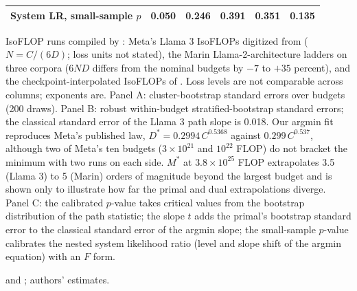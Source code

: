 \begin{table}[tp]
\begin{tabular}{@{}lccccc@{}}
System LR, small-sample $p$ & 0.050 & 0.246 & 0.391 & 0.351 & 0.135 \\
\bottomrule
\end{tabular}
\par\smallskip
\begin{tablenotes}IsoFLOP runs compiled by \citet{czech2026problems}: Meta's Llama 3 IsoFLOPs digitized from
\citet{grattafiori2024llama} ($N=C/(6D)$; loss units not stated), the Marin Llama-2-architecture ladders on three
corpora \citep{marin2026ladders} ($6ND$ differs from the nominal budgets by $-7$ to $+35$ percent), and the
checkpoint-interpolated IsoFLOPs of \citet{li2025misfitting}. Loss levels are not comparable across columns;
exponents are. Panel A: cluster-bootstrap standard errors over budgets (200 draws). Panel B: robust within-budget
stratified-bootstrap standard errors; the classical standard error of the Llama 3 path slope is 0.018. Our
argmin fit reproduces Meta's published law, $D^*=0.2994\,C^{0.5368}$ against $0.299\,C^{0.537}$, although two of Meta's ten budgets ($3\times10^{21}$ and $10^{22}$ FLOP) do not bracket the minimum with two runs on each side. $M^*$ at
$3.8\times10^{25}$ FLOP extrapolates 3.5 (Llama 3) to 5 (Marin) orders of magnitude beyond the largest budget and is
shown only to illustrate how far the primal and dual extrapolations diverge. Panel C: the calibrated $p$-value
takes critical values from the bootstrap distribution of the path statistic; the slope $t$ adds the primal's
bootstrap standard error to the classical standard error of the argmin slope; the small-sample $p$-value
calibrates the nested system likelihood ratio (level and slope shift of the argmin equation) with an $F$
form.\end{tablenotes}
\begin{tablenotes}[Source]\citet{czech2026problems} and \citet{czech2026llama3isoflop}; authors'
estimates.\end{tablenotes}
\end{table}

